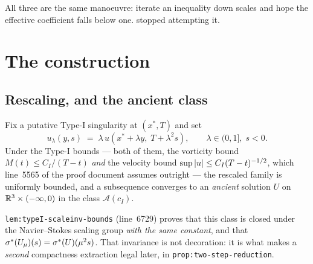 All three are the same manoeuvre: iterate an inequality down scales and hope
the effective coefficient falls below one.  stopped attempting it.

\section{The construction}
\label{sec:rigidity-construction}

\subsection{Rescaling, and the ancient class}

Fix a putative Type-I singularity at \((x^*,T)\) and set
\begin{equation}\label{eq:rescale}
  u_\lambda(y,s) \;=\; \lambda\,u\!\left(x^*+\lambda y,\;T+\lambda^2 s\right),
  \qquad \lambda\in(0,1],\; s<0 .
\end{equation}
Under the Type-I bounds --- both of them, the vorticity bound
\(M(t)\le C_I/(T-t)\) \emph{and} the velocity bound
\(\sup\left|u\right|\le C_I(T-t)^{-1/2}\), which line~5565 of the proof document
assumes outright --- the rescaled family is uniformly bounded, and a
subsequence converges to an \emph{ancient} solution \(U\) on
\(\mathbb{R}^3\times(-\infty,0)\) in the class \(\mathcal{A}(c_I)\).

\texttt{lem:typeI-scaleinv-bounds} (line~6729) proves that this class is
closed under the Navier--Stokes scaling group \emph{with the same constant},
and that \(\sigma^{*}(U_\mu)(s)=\sigma^{*}(U)(\mu^2 s)\). That invariance is not
decoration: it is what makes a \emph{second} compactness extraction legal
later, in \texttt{prop:two-step-reduction}.

